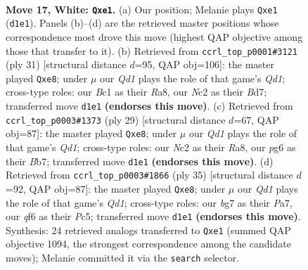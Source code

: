 \documentclass[11pt]{article}
\begin{document}
\clearpage

\begin{figure}[p]\centering
\begin{subfigure}{0.46\textwidth}\centering
\resizebox{\linewidth}{!}{%
\newchessgame
\chessboard[
  setfen={rn4k1/pp3pbp/1n3qp1/3p1b2/3P4/1B5P/PPN2PP1/RNBQr1K1 w - - 0 17},
  showmover=false,
  pgfstyle=straightmove, color=movearrow, markmove={d1-e1}
]}
\caption{}
\end{subfigure}\hfill
\begin{subfigure}{0.46\textwidth}\centering
\resizebox{\linewidth}{!}{%
\newchessgame
\chessboard[
  setfen={r2qR1k1/1ppb1ppp/1p4n1/3n4/3N4/2P2P2/PP4PP/R1BQ1BK1 b - - 0 16},
  showmover=false,
  pgfstyle=straightmove, color=movearrow, markmove={d8-e8}
]}
\caption{}
\end{subfigure}
\\[4pt]
\begin{subfigure}{0.46\textwidth}\centering
\resizebox{\linewidth}{!}{%
\newchessgame
\chessboard[
  setfen={r2qR1k1/1bp2ppp/5b2/pp1n4/3P4/1BP5/PP1B1PPP/RN1Q2K1 b - - 0 15},
  showmover=false,
  pgfstyle=straightmove, color=movearrow, markmove={d8-e8}
]}
\caption{}
\end{subfigure}\hfill
\begin{subfigure}{0.46\textwidth}\centering
\resizebox{\linewidth}{!}{%
\newchessgame
\chessboard[
  setfen={r2qR1k1/pb1n1pp1/1p3b1p/2pP4/8/1PB2NP1/P4PBP/2RQ2K1 b - - 0 18},
  showmover=false,
  pgfstyle=straightmove, color=movearrow, markmove={d8-e8}
]}
\caption{}
\end{subfigure}
\caption{\textbf{Move 17, White: \texttt{Qxe1}.} (a) Our position; Melanie plays \texttt{Qxe1} (\texttt{d1e1}). Panels (b)--(d) are the retrieved master positions whose correspondence most drove this move (highest QAP objective among those that transfer to it). (b) Retrieved from \texttt{ccrl\_top\_p0001\#3121} (ply 31) [structural distance $d$=95, QAP obj=106]: the master played \texttt{Qxe8}; under $\mu$ our \emph{Qd1} plays the role of that game's \emph{Qd1}; cross-type roles: our \emph{B}c1 as their \emph{R}a8, our \emph{N}c2 as their \emph{B}d7; transferred move \texttt{d1e1} \textbf{(endorses this move)}. (c) Retrieved from \texttt{ccrl\_top\_p0003\#1373} (ply 29) [structural distance $d$=67, QAP obj=87]: the master played \texttt{Qxe8}; under $\mu$ our \emph{Qd1} plays the role of that game's \emph{Qd1}; cross-type roles: our \emph{N}c2 as their \emph{R}a8, our \emph{p}g6 as their \emph{B}b7; transferred move \texttt{d1e1} \textbf{(endorses this move)}. (d) Retrieved from \texttt{ccrl\_top\_p0003\#1866} (ply 35) [structural distance $d$=92, QAP obj=87]: the master played \texttt{Qxe8}; under $\mu$ our \emph{Qd1} plays the role of that game's \emph{Qd1}; cross-type roles: our \emph{b}g7 as their \emph{P}a7, our \emph{q}f6 as their \emph{P}c5; transferred move \texttt{d1e1} \textbf{(endorses this move)}. Synthesis: 24 retrieved analogs transferred to \texttt{Qxe1} (summed QAP objective 1094, the strongest correspondence among the candidate moves); Melanie committed it via the \texttt{search} selector.}
\label{fig:thought-m32}
\end{figure}
\end{document}
